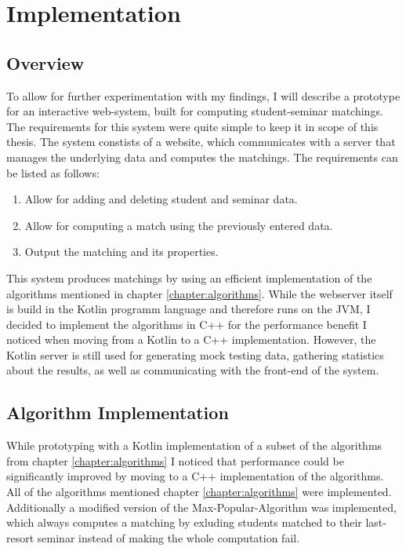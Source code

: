 \section{Implementation}

\subsection{Overview}
To allow for further experimentation with my findings, I will describe a prototype for an interactive web-system, built for computing student-seminar matchings. The requirements for this system were quite simple to keep it in scope of this thesis. The system constists of a website, which communicates with a server that manages the underlying data and computes the matchings. The requirements can be listed as follows:
\begin{enumerate}
    \item Allow for adding and deleting student and seminar data.
    \item Allow for computing a match using the previously entered data.
    \item Output the matching and its properties.
\end{enumerate}
This system produces matchings by using an efficient implementation of the algorithms mentioned in chapter \ref{chapter:algorithms}. While the webserver itself is build in the Kotlin programm language and therefore runs on the JVM, I decided to implement the algorithms in C++ for the performance benefit I noticed when moving from a Kotlin to a C++ implementation. However, the Kotlin server is still used for generating mock testing data, gathering statistics about the results, as well as communicating with the front-end of the system.

\subsection{Algorithm Implementation}
While prototyping with a Kotlin implementation of a subset of the algorithms from chapter \ref{chapter:algorithms} I noticed that performance could be significantly improved by moving to a C++ implementation of the algorithms. All of the algorithms mentioned chapter \ref{chapter:algorithms} were implemented. Additionally a modified version of the Max-Popular-Algorithm was implemented, which always computes a matching by exluding students matched to their last-resort seminar instead of making the whole computation fail.

